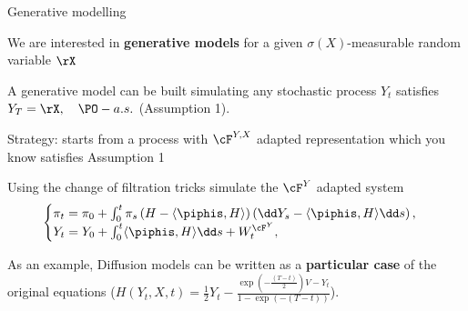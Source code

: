 \begin{frame}[allowframebreaks]{Generative modelling}


\begin{itemize}
    \item We are interested in \textbf{generative models} for a given $\sigma(X)$-measurable random variable $\rX$
{\color{red}
    \item A generative model can be built simulating any stochastic process $Y_t$ satisfies $Y_T=\rX,\quad \PO-a.s.$ (Assumption 1).}
    \item Strategy: starts from a process with $\cF^{Y,X}$ adapted representation which you know satisfies Assumption 1
    \item Using the change of filtration tricks simulate the $\cF^{Y}$ adapted system 
    \begin{equation}\label{eq:system}
\begin{cases}
\pi_t=\pi_0+\int_0^t \pi_s\left(H-\langle \piphis,H\rangle\right) \left(\dd Y_s-\langle \piphis,H\rangle\dd s\right),\\
Y_t=Y_0+\int_0^t \langle \piphis,H\rangle \dd s+{W}^{\cF^Y}_t,    
\end{cases}
\end{equation}
\item As an example, Diffusion models can be written as a \textbf{particular case} of the original equations ($H(Y_t,X,t)=\frac{1}{2}Y_t -\frac{\exp(-\frac{(T-t)}{2})V-Y_t}{1-\exp(-(T-t))}$).
\end{itemize}


\framebreak




\end{frame}



